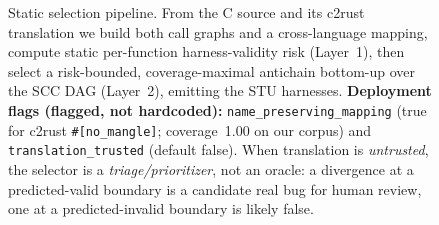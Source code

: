 \begin{figure}[t]
  \centering
  \caption{Static selection pipeline. From the C source and its c2rust
    translation we build both call graphs and a cross-language mapping, compute
    static per-function harness-validity risk (Layer~1), then select a
    risk-bounded, coverage-maximal antichain bottom-up over the SCC DAG
    (Layer~2), emitting the STU harnesses. \textbf{Deployment flags
    (flagged, not hardcoded):} \texttt{name\_preserving\_mapping} (true for
    c2rust \texttt{\#[no\_mangle]}; coverage~1.00 on our corpus) and
    \texttt{translation\_trusted} (default false). When translation is
    \emph{untrusted}, the selector is a \emph{triage/prioritizer}, not an oracle:
    a divergence at a predicted-valid boundary is a candidate real bug for human
    review, one at a predicted-invalid boundary is likely false.}
  \label{fig:pipeline}
\end{figure}

